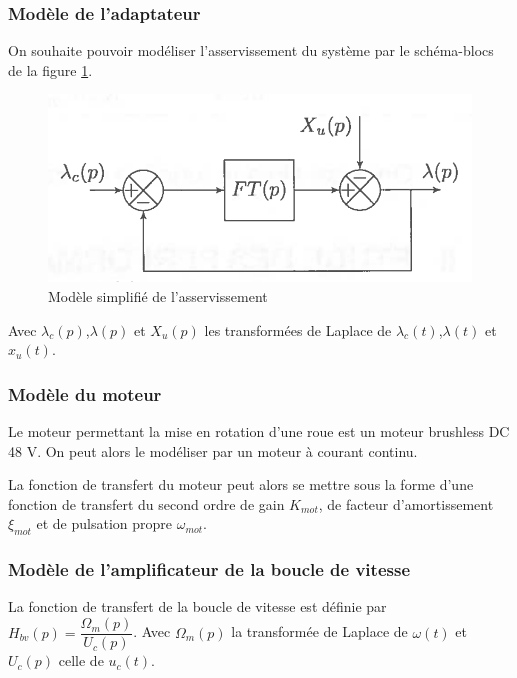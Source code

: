 \subsubsection{Modèle de l'adaptateur}

On souhaite pouvoir modéliser l'asservissement du système par le schéma-blocs de la figure \ref{fig04}.

\begin{figure}[ht!]
\begin{center}
 \includegraphics[width=0.3\linewidth]{img/fig04}
\end{center}
\caption{Modèle simplifié de l'asservissement}
\label{fig04}
\end{figure}

Avec $\lambda_c(p)$,$\lambda(p)$ et $X_u(p)$ les transformées de Laplace de $\lambda_c(t)$,$\lambda(t)$ et $x_u(t)$.


\subsubsection{Modèle du moteur}

Le moteur permettant la mise en rotation d'une roue est un moteur brushless DC 48 V. On peut alors le modéliser par un moteur à courant continu.

La fonction de transfert du moteur peut alors se mettre sous la forme d'une fonction de transfert du second ordre de gain $K_{mot}$, de facteur d'amortissement $\xi_{mot}$ et de pulsation propre $\omega_{mot}$.

\subsubsection{Modèle de l'amplificateur de la boucle de vitesse}

La fonction de transfert de la boucle de vitesse est définie par $H_{bv}(p) = \dfrac{\Omega_m(p)}{U_c(p)}$. Avec $\Omega_m(p)$ la transformée de Laplace de $\omega(t)$ et $U_c(p)$ celle de $u_c(t)$.



